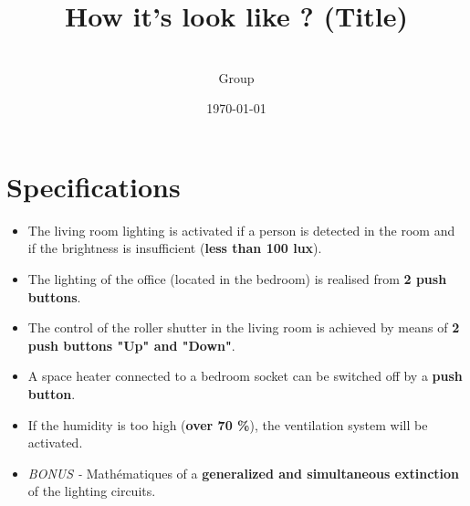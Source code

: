 

\setcounter{tocdepth}{5}




  \titlehead{{\Large Mathématiques} \hfill 1$^{st}$ year - 2022/2023}
  \title{How it's look like ? (Title)}
  \author{\firstName\ \lastName \\Group \groupNumber}
  \date{\today}
  \publishers{\university}

  \maketitle

  \noindent\makebox[\linewidth]{\rule{7.5cm}{0.4pt}}

  \tableofcontents
  \newpage


  \section{Specifications}

    \begin{vertAlign}
      \begin{itemize}[label=\color{green}]

        \Large
        \setlength\itemsep{0.8cm}


        \item The living room lighting is activated if a person is detected in the room and if the brightness is insufficient (\textbf{less than 100 lux}).

        \item The lighting of the office (located in the bedroom) is realised from \textbf{2 push buttons}.

        \item The control of the roller shutter in the living room is achieved by means of \textbf{2 push buttons "Up" and "Down"}.

        \item A space heater connected to a bedroom socket can be switched off by a \textbf{push button}.

        \item If the humidity is too high (\textbf{over 70 \%}), the ventilation system will be activated.

        \item[\color{red}\ding{56}] {\color{gray}\textit{BONUS -}} Mathématiques of a \textbf{generalized and simultaneous extinction} of the lighting circuits.
      \end{itemize}
    \end{vertAlign}


